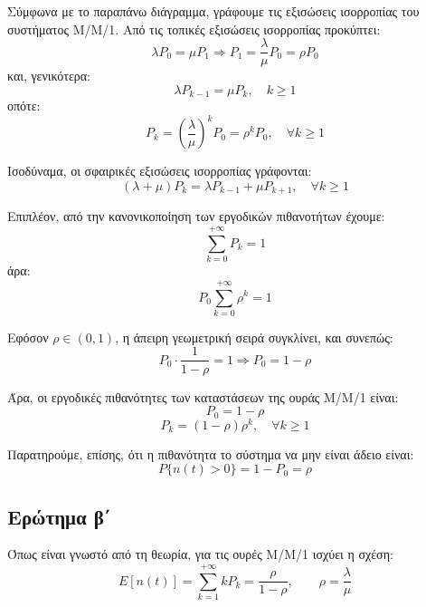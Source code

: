 \documentclass{article}
\begin{document}
Σύμφωνα με το παραπάνω διάγραμμα, γράφουμε τις εξισώσεις ισορροπίας του
συστήματος Μ/Μ/1. Από τις τοπικές εξισώσεις ισορροπίας προκύπτει:
\begin{equation}
\lambda P_0 = \mu P_1 \Rightarrow P_1 = \frac{\lambda}{\mu} P_0 = \rho P_0
\end{equation}
και, γενικότερα:
\begin{equation}
\lambda P_{k-1} = \mu P_k, \quad k \geq 1
\end{equation}
οπότε:
\begin{equation}
P_k = \left(\frac{\lambda}{\mu}\right)^k P_0 = \rho^k P_0, \quad \forall k \geq 1
\end{equation}

Ισοδύναμα, οι σφαιρικές εξισώσεις ισορροπίας γράφονται:
\begin{equation}
(\lambda + \mu)P_k = \lambda P_{k-1} + \mu P_{k+1}, \quad \forall k \geq 1
\end{equation}

Επιπλέον, από την κανονικοποίηση των εργοδικών πιθανοτήτων έχουμε:
\begin{equation}
\sum_{k=0}^{+\infty} P_k = 1
\end{equation}
άρα:
\begin{equation}
P_0 \sum_{k=0}^{+\infty} \rho^k = 1
\end{equation}

Εφόσον $\rho \in (0,1)$, η άπειρη γεωμετρική σειρά συγκλίνει, και συνεπώς:
\begin{equation}
P_0 \cdot \frac{1}{1-\rho} = 1 \Rightarrow P_0 = 1-\rho
\end{equation}

Άρα, οι εργοδικές πιθανότητες των καταστάσεων της ουράς Μ/Μ/1 είναι:
\begin{equation}
P_0 = 1-\rho
\end{equation}
\begin{equation}
P_k = (1-\rho)\rho^k, \quad \forall k \geq 1
\end{equation}

Παρατηρούμε, επίσης, ότι η πιθανότητα το σύστημα να μην είναι άδειο είναι:
\begin{equation}
P\{n(t) > 0\} = 1 - P_0 = \rho
\end{equation}

\subsection{Ερώτημα β΄}

Όπως είναι γνωστό από τη θεωρία, για τις ουρές Μ/Μ/1 ισχύει η σχέση:
\begin{equation}
E[n(t)] = \sum_{k=1}^{+\infty} kP_k = \frac{\rho}{1-\rho}, \qquad \rho = \frac{\lambda}{\mu}
\end{equation}
\end{document}
